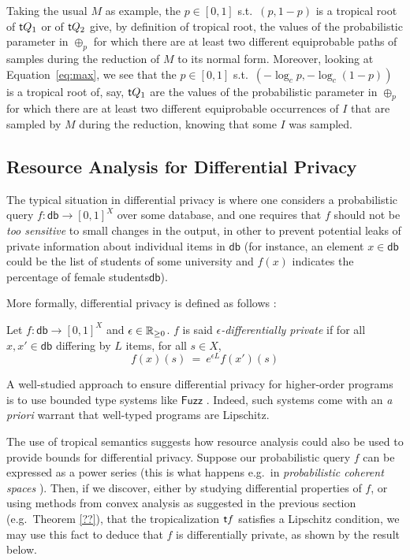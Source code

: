 \begin{remark}
 Taking the usual $M$ as example, the $p\in[0,1]$ s.t.\ $(p,1-p)$ is a tropical root of $\mathsf{t} Q_1$ or of $\mathsf{t} Q_2$ give, by definition of tropical root, the values of the probabilistic parameter in $\oplus_p$ for which there are at least two different equiprobable paths of samples during the reduction of $M$ to its normal form.
 Moreover, looking at Equation~\ref{eq:max}, we see that the $p\in[0,1]$ s.t.\ $(-\log_c p,-\log_c(1-p))$ is a tropical root of, say, $\mathsf{t} Q_1$ are the values of the probabilistic parameter in $\oplus_p$ for which there are at least two different equiprobable occurrences of $I$ that are sampled by $M$ during the reduction, knowing that some $I$ was sampled.
\end{remark}


\subsection{Resource Analysis for Differential Privacy}

The typical situation in differential privacy is where one considers a probabilistic query $f: \mathsf{db}\to [0,1]^{X}$ over some database, and one requires that $f$ should not be \emph{too sensitive} to small changes in the output, in other to prevent potential leaks of private information about individual items in $\mathsf{db}$ (for instance, an element $x\in\mathsf{db}$ could be the list of students of some university and $f(x)$ indicates the percentage of female students$\mathsf{db}$).

More formally, differential privacy is defined as follows \cite{}:
\begin{definition}
Let $f: \mathsf{db}\to [0,1]^{X}$ and $\epsilon \in \mathbb{R}_{\geq 0}$. $f$ is said \emph{$\epsilon$-differentially private} if for all $x,x'\in \mathsf{db}$
differing by $L$ items, for all $s\in X$, 
$$
f(x)(s) \ = \ e^{\epsilon L} f(x')(s)
$$
\end{definition}

A well-studied approach to ensure differential privacy for higher-order programs is to use bounded type systems like $\mathsf{Fuzz}$ \cite{}. Indeed, such systems come with an \emph{a priori} warrant that well-typed programs are Lipschitz.

The use of tropical semantics suggests how resource analysis could also be used to provide bounds for differential privacy. 
Suppose our probabilistic query $f$ can be expressed as a power series (this is what happens e.g.~in \emph{probabilistic coherent spaces} \cite{}). Then, if we discover, either by studying differential properties of $f$, or using methods from convex analysis as suggested in the previous section (e.g.~Theorem \ref{??}), 
 that the tropicalization $\mathsf{t} f$ satisfies a Lipschitz condition, we may use this fact to deduce that $f$ is differentially private, as shown by the result below.

